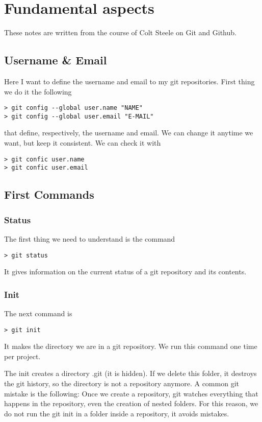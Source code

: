 \section{Fundamental aspects}

These notes are written from the course of Colt Steele on Git and Github.

\subsection{Username \& Email}

Here I want to define the username and email to my git repositories. 
First thing we do it the following
\begin{verbatim}
> git config --global user.name "NAME"
> git config --global user.email "E-MAIL"
\end{verbatim}
that define, respectively, the username and email. We can change it anytime we want, 
but keep it consistent. We can check it with
\begin{verbatim}
> git confic user.name
> git confic user.email
\end{verbatim}

\subsection{First Commands}

\subsubsection{Status} The first thing we need to understand is the command 
\begin{verbatim}
> git status
\end{verbatim}
It gives information on the current status of a git repository and its contents. 

\subsubsection{Init} The next command is 
\begin{verbatim}
> git init
\end{verbatim}
It makes the directory we are in a git repository. We run this command one time per project. 

The init creates a directory .git (it is hidden). If we delete this folder, 
it destroys the git history, so the directory is not a repository anymore. 
A common git mistake is the following: Once we create a repository, git watches 
everything that happens in the repository, even the creation of nested folders. 
For this reason, we do not run the git init in a folder inside a repository, 
it avoids mistakes.

